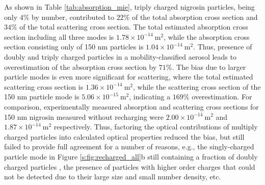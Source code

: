 As shown in Table \ref{tab:absorption_mie}, triply charged nigrosin particles, being only $4\%$ by number, contributed to $22\%$ of the total absorption cross section and $34\%$ of the total scattering cross section. The total estimated absorption cross section including all three modes is $1.78\times 10^{-14}\ \mathrm{m}^2$, while the absorption cross section consisting only of 150 nm particles is $1.04\times 10^{-14}\ \mathrm{m}^2$. Thus, presence of doubly and triply charged particles in a mobility-classified aerosol leads to overestimation of the absorption cross section by $71\%$. The bias due to larger particle modes is even more significant for scattering, where the total estimated scattering cross section is $1.36\times 10^{-14}\ \mathrm{m}^2$, while the scattering cross section of the 150 nm particle mode is $5.06\times 10^{-15}\ \mathrm{m}^2$, indicating a $169\%$ overestimation. For comparison, experimentally measured absorption and scattering cross sections for 150 nm nigrosin measured without recharging were $2.00\times 10^{-14}\ \mathrm{m}^2$ and $1.87\times 10^{-14}\ \mathrm{m}^2$ respectively. Thus, factoring the optical contributions of multiply charged particles into calculated optical properties reduced the bias, but still failed to provide full agreement for a number of reasons, e.g., the singly-charged particle mode in Figure \ref{s:fig:recharged_all}b still containing a fraction of doubly charged particles \citep{RN7}, the presence of particles with higher order charges that could not be detected due to their large size and small number density, etc.

